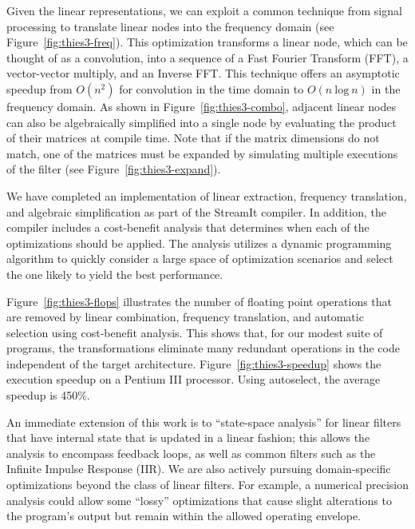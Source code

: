 \documentclass{csailabstractbook}
\begin{document}
\clearpage
Given the linear representations, we can exploit a common technique
from signal processing to translate linear nodes into the frequency
domain (see Figure~\ref{fig:thies3-freq}).  This optimization
transforms a linear node, which can be thought of as a convolution,
into a sequence of a Fast Fourier Transform (FFT), a vector-vector
multiply, and an Inverse FFT.  This technique offers an asymptotic
speedup from $O(n^2)$ for convolution in the time domain to $O(n~
\mbox{log}~n)$ in the frequency domain.  As shown in
Figure~\ref{fig:thies3-combo}, adjacent linear nodes can also be
algebraically simplified into a single node by evaluating the product
of their matrices at compile time.  Note that if the matrix dimensions
do not match, one of the matrices must be expanded by simulating
multiple executions of the filter (see
Figure~\ref{fig:thies3-expand}).


We have completed an implementation of linear extraction, frequency
translation, and algebraic simplification as part of the StreamIt
compiler.  In addition, the compiler includes a cost-benefit analysis
that determines when each of the optimizations should be applied.  The
analysis utilizes a dynamic programming algorithm to quickly consider
a large space of optimization scenarios and select the one likely to
yield the best performance.

Figure~\ref{fig:thies3-flops} illustrates the number of floating point
operations that are removed by linear combination, frequency
translation, and automatic selection using cost-benefit analysis.
This shows that, for our modest suite of programs, the transformations
eliminate many redundant operations in the code independent of the
target architecture.  Figure~\ref{fig:thies3-speedup} shows the
execution speedup on a Pentium III processor.  Using autoselect, the
average speedup is 450\%.

 An immediate extension of this work is to
``state-space analysis'' for linear filters that have internal state
that is updated in a linear fashion; this allows the analysis to
encompass feedback loops, as well as common filters such as the
Infinite Impulse Response (IIR).  We are also actively pursuing
domain-specific optimizations beyond the class of linear filters.  For
example, a numerical precision analysis could allow some ``lossy''
optimizations that cause slight alterations to the program's output
but remain within the allowed operating envelope.
\end{document}
